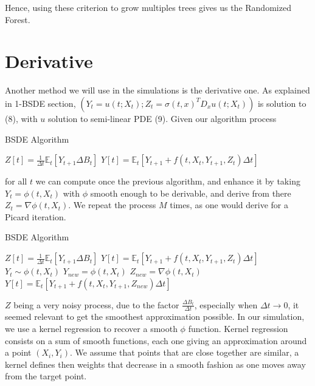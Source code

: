 \documentclass[english,11pt,openany]{report}
\theoremstyle{definition}
\theoremstyle{plain}
\theoremstyle{definition}
\begin{document}
Hence, using these criterion to grow multiples trees gives us the Randomized Forest.


\section{Derivative}

Another method we will use in the simulations is the derivative one. 
As explained in 1-BSDE section, $(Y_t = u(t;X_t);Z_t =\sigma(t,x)^T D_xu(t;X_t))$ is solution to (8), with $u$ solution to semi-linear PDE (9).  
Given our algorithm process


\begin{algorithm}[H]
\caption{BSDE Algorithm}\label{algo:derivative1}
\begin{algorithmic}[1]
		\State $Z[t] =\frac{1}{\Delta t}\mathbb{E}_t[Y_{t + 1} \Delta B_t]$
		\State $Y[t] = \mathbb{E}_t[Y_{t+1} +  f(t,X_t, Y_{t+1}, Z_t)\Delta t]$
		\EndFor
		\EndProcedure
\end{algorithmic}
\end{algorithm}

for all $t$ we can compute once the previous algorithm, and enhance it by taking $Y_t = \phi(t, X_t)$ with $\phi$ smooth enough to be derivable, and derive from there $Z_t = \nabla \phi (t, X_t)$. We repeat the process $M$ times, as one would derive for a Picard iteration.


\begin{algorithm}[H]
	\caption{BSDE Algorithm}
	\label{algo:derivative2}
	\begin{algorithmic}[1]
		\State $Z[t] =\frac{1}{\Delta t}\mathbb{E}_t[Y_{t + 1} \Delta B_t]$ 
		\State $Y[t] = \mathbb{E}_t[Y_{t+1} +  f(t,X_t, Y_{t+1}, Z_t)\Delta t]$
		\State  {} $Y_t \sim \phi(t, X_t)$
		\State  $Y_{new} = \phi(t, X_t)$
		\State 	$Z_{new} = \nabla \phi(t, X_t)$ 
		\State  $Y[t] = \mathbb{E}_t[Y_{t+1} +  f(t,X_t, Y_{t+1}, Z_{new})\Delta t]$
		\EndFor
		\EndFor
		\EndProcedure
	\end{algorithmic}
\end{algorithm}

\noindent
$Z$ being a very noisy process, due to the factor $\frac{\Delta B_t}{\Delta t}$, especially when $\Delta t \rightarrow 0$, it seemed relevant to get the smoothest approximation possible. 
\noindent
In our simulation, we use a kernel regression to recover a smooth $\phi$ function. 
Kernel regression consists on a sum of smooth functions, each one giving an approximation around a point $(X_i, Y_i)$.
\noindent
We assume that points  that  are  close  together  are  similar,  a  kernel defines  then weights  that  decrease  in  a  smooth  fashion  as  one  moves  away from the target point.
 
\end{document}
